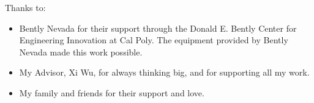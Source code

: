 \noindent
Thanks to:
\begin{itemize}
    \item Bently Nevada for their support through the Donald E. Bently Center for Engineering Innovation at Cal Poly. The equipment provided by Bently Nevada made this work possible.
    \item My Advisor, Xi Wu, for always thinking big, and for supporting all my work.
    \item My family and friends for their support and love.
\end{itemize}
